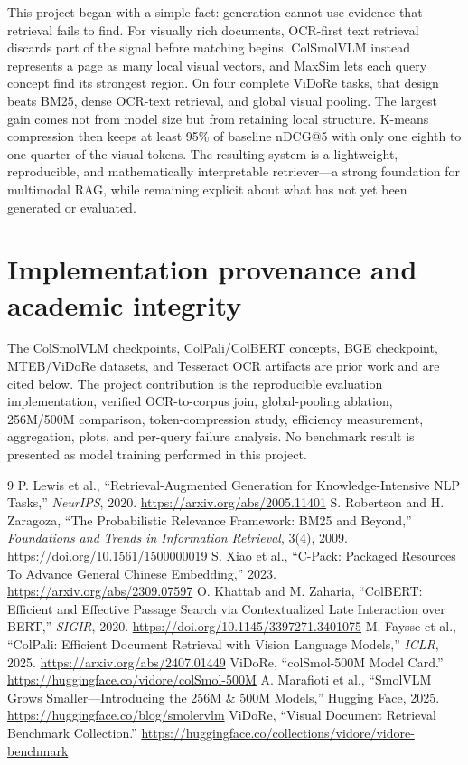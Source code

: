\documentclass[11pt,a4paper]{article}
\begin{document}
This project began with a simple fact: generation cannot use evidence that retrieval fails to find. For visually rich documents, OCR-first text retrieval discards part of the signal before matching begins. ColSmolVLM instead represents a page as many local visual vectors, and MaxSim lets each query concept find its strongest region. On four complete ViDoRe tasks, that design beats BM25, dense OCR-text retrieval, and global visual pooling. The largest gain comes not from model size but from retaining local structure. K-means compression then keeps at least 95\% of baseline nDCG@5 with only one eighth to one quarter of the visual tokens. The resulting system is a lightweight, reproducible, and mathematically interpretable retriever---a strong foundation for multimodal RAG, while remaining explicit about what has not yet been generated or evaluated.

\section*{Implementation provenance and academic integrity}
The ColSmolVLM checkpoints, ColPali/ColBERT concepts, BGE checkpoint, MTEB/ViDoRe datasets, and Tesseract OCR artifacts are prior work and are cited below. The project contribution is the reproducible evaluation implementation, verified OCR-to-corpus join, global-pooling ablation, 256M/500M comparison, token-compression study, efficiency measurement, aggregation, plots, and per-query failure analysis. No benchmark result is presented as model training performed in this project.

\begin{thebibliography}{9}
 P. Lewis et al., ``Retrieval-Augmented Generation for Knowledge-Intensive NLP Tasks,'' \emph{NeurIPS}, 2020. \url{https://arxiv.org/abs/2005.11401}
 S. Robertson and H. Zaragoza, ``The Probabilistic Relevance Framework: BM25 and Beyond,'' \emph{Foundations and Trends in Information Retrieval}, 3(4), 2009. \url{https://doi.org/10.1561/1500000019}
 S. Xiao et al., ``C-Pack: Packaged Resources To Advance General Chinese Embedding,'' 2023. \url{https://arxiv.org/abs/2309.07597}
 O. Khattab and M. Zaharia, ``ColBERT: Efficient and Effective Passage Search via Contextualized Late Interaction over BERT,'' \emph{SIGIR}, 2020. \url{https://doi.org/10.1145/3397271.3401075}
 M. Faysse et al., ``ColPali: Efficient Document Retrieval with Vision Language Models,'' \emph{ICLR}, 2025. \url{https://arxiv.org/abs/2407.01449}
 ViDoRe, ``colSmol-500M Model Card.'' \url{https://huggingface.co/vidore/colSmol-500M}
 A. Marafioti et al., ``SmolVLM Grows Smaller---Introducing the 256M \& 500M Models,'' Hugging Face, 2025. \url{https://huggingface.co/blog/smolervlm}
 ViDoRe, ``Visual Document Retrieval Benchmark Collection.'' \url{https://huggingface.co/collections/vidore/vidore-benchmark}
\end{thebibliography}
\end{document}

